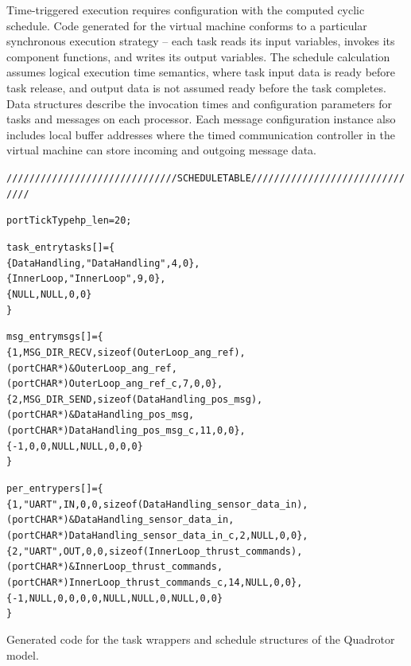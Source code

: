 Time-triggered execution requires configuration with the computed 
cyclic schedule.  Code generated for the virtual machine 
conforms to a particular synchronous execution strategy -- each 
task reads its input variables, invokes its component functions, and 
writes its output variables.  The schedule calculation assumes logical
execution time semantics, where task input data is ready before 
task release, and output data is not assumed ready before the task 
completes\cite{modeling:giotto3}. Data structures describe the 
invocation times and configuration parameters for tasks and messages
on each processor.   
Each message configuration instance also includes local buffer addresses 
where the timed communication controller in the virtual machine 
can store incoming and outgoing message data.  

\begin{table}
\centering
\begin{alltt}
////////////////////////////// SCHEDULE TABLE ///////////////////////////////

portTickType hp_len = 20;

task\_entry tasks[] = \{
   \{ DataHandling, "DataHandling", 4, 0\},
   \{ InnerLoop, "InnerLoop", 9, 0\},
   \{NULL, NULL, 0, 0\}
\}\;

msg\_entry msgs[] = \{
   \{ 1, MSG\_DIR\_RECV, sizeof( OuterLoop\_ang\_ref ), 
      (portCHAR *) \& OuterLoop\_ang\_ref, 
      (portCHAR *) OuterLoop_ang\_ref\_c, 7, 0, 0\},
   \{ 2, MSG\_DIR\_SEND, sizeof( DataHandling\_pos\_msg ), 
      (portCHAR *) \& DataHandling\_pos\_msg, 
      (portCHAR *) DataHandling\_pos\_msg\_c, 11, 0, 0\},
   \{ -1, 0, 0, NULL, NULL, 0, 0, 0\}
\}\;

per\_entry pers[] = \{
   \{ 1, "UART", IN, 0, 0, sizeof( DataHandling\_sensor\_data\_in ), 
      (portCHAR *) \& DataHandling\_sensor\_data\_in, 
      (portCHAR *) DataHandling\_sensor\_data\_in\_c, 2, NULL, 0, 0\},
   \{ 2, "UART", OUT, 0, 0, sizeof( InnerLoop\_thrust\_commands ), 
      (portCHAR *) \& InnerLoop\_thrust\_commands, 
      (portCHAR *) InnerLoop\_thrust\_commands\_c, 14, NULL, 0, 0\},
   \{ -1, NULL, 0, 0, 0, 0, NULL, NULL, 0, NULL, 0, 0 \}
\}\;

\end{alltt}
\caption{Generated code for the task wrappers and schedule structures of the Quadrotor model.}
\label{code:frodo_gen}
\end{table}

